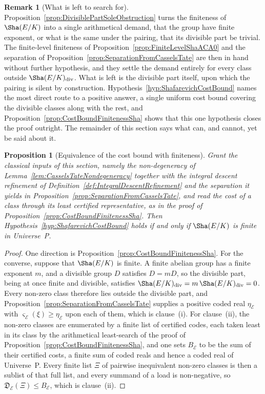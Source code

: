 \documentclass[10pt, reqno]{amsart}
\theoremstyle{plain}
\newtheorem{proposition}[theorem]{Proposition}
\theoremstyle{definition}
\newtheorem{remark}[theorem]{Remark}
\theoremstyle{plain}
\begin{document}
\begin{remark}[What is left to search for]
\label{rem:TowerSearchesBoundedExponent}
Proposition~\ref{prop:DivisiblePartSoleObstruction} turns the finiteness of $\Sha(E/K)$ into a single arithmetical demand, that the group have finite exponent, or what is the same under the pairing, that its divisible part be trivial. The finite-level finiteness of Proposition~\ref{prop:FiniteLevelShaACA0} and the separation of Proposition~\ref{prop:SeparationFromCasselsTate} are then in hand without further hypothesis, and they settle the demand entirely for every class outside $\Sha(E/K)_{\mathrm{div}}$. What is left is the divisible part itself, upon which the pairing is silent by construction. Hypothesis~\ref{hyp:ShafarevichCostBound} names the most direct route to a positive answer, a single uniform cost bound covering the divisible classes along with the rest, and Proposition~\ref{prop:CostBoundFinitenessSha} shows that this one hypothesis closes the proof outright. The remainder of this section says what can, and cannot, yet be said about it.
\end{remark}

\begin{proposition}[Equivalence of the cost bound with finiteness]
\label{prop:CostBoundEquivalentFiniteness}
Grant the classical inputs of this section, namely the non-degeneracy of Lemma~\ref{lem:CasselsTateNondegeneracy} together with the integral descent refinement of Definition~\ref{def:IntegralDescentRefinement} and the separation it yields in Proposition~\ref{prop:SeparationFromCasselsTate}, and read the cost of a class through its least certified representative, as in the proof of Proposition~\ref{prop:CostBoundFinitenessSha}. Then Hypothesis~\ref{hyp:ShafarevichCostBound} holds if and only if $\Sha(E/K)$ is finite in Universe~P.
\end{proposition}

\begin{proof}
One direction is Proposition~\ref{prop:CostBoundFinitenessSha}. For the converse, suppose that $\Sha(E/K)$ is finite. A finite abelian group has a finite exponent $m$, and a divisible group $D$ satisfies $D=mD$, so the divisible part, being at once finite and divisible, satisfies $\Sha(E/K)_{\mathrm{div}}=m\,\Sha(E/K)_{\mathrm{div}}=0$. Every non-zero class therefore lies outside the divisible part, and Proposition~\ref{prop:SeparationFromCasselsTate} supplies a positive coded real $\eta_{\mathcal{E}}$ with $\varsigma_{\mathcal{E}}(\xi)\ge\eta_{\mathcal{E}}$ upon each of them, which is clause~\textup{(i)}. For clause~\textup{(ii)}, the non-zero classes are enumerated by a finite list of certified codes, each taken least in its class by the arithmetical least-search of the proof of Proposition~\ref{prop:CostBoundFinitenessSha}, and one sets $B_{\mathcal{E}}$ to be the sum of their certified costs, a finite sum of coded reals and hence a coded real of Universe~P. Every finite list $\Xi$ of pairwise inequivalent non-zero classes is then a sublist of that full list, and every summand of a load is non-negative, so $\mathfrak{D}_{\mathcal{E}}(\Xi)\le B_{\mathcal{E}}$, which is clause~\textup{(ii)}.
\end{proof}
\end{document}
